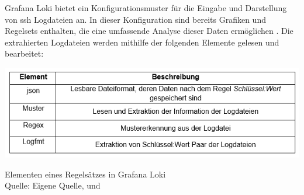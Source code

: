 Grafana Loki bietet ein Konfigurationsmuster für die Eingabe und Darstellung von \gls{ssh} Logdateien an. In dieser Konfiguration sind bereits Grafiken und Regelsets enthalten, die eine umfassende Analyse dieser Daten ermöglichen \citep{VoidQuark_sshlogs}. Die extrahierten Logdateien werden mithilfe der folgenden Elemente gelesen und bearbeitet:

\begin{table}[H]
   \includegraphics[width=\linewidth]{assets/tabelle_sshgrafana.png}
   \caption[Elementen eines Regelsätzes in Grafana Loki]
   {Elementen eines Regelsätzes in Grafana Loki \\Quelle: Eigene Quelle, \citep{VoidQuark_sshlogs} und \citep{Setter_Logfmt}}
\end{table}







